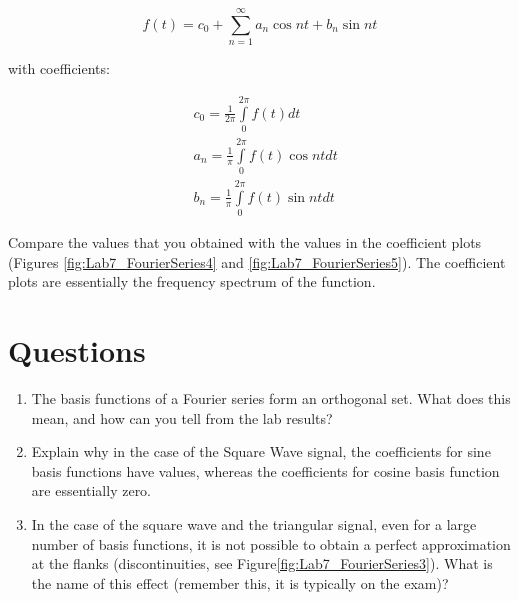 \documentclass[11pt,letterpaper]{article}
\begin{document}
\begin{enumerate}
\begin{equation}\label{Lab7_FourierSeries7}
f(t) = c_0 + \sum\limits_{n=1}^{\infty} a_n \cos nt + b_n \sin nt 
\end{equation}

with coefficients:

\begin{align}\label{Lab7_FourierSeries8}
 & c_0=\frac{1}{2\pi }\int\limits_{0}^{2\pi }{f\left( t \right)dt} \\ 
 & a_n=\frac{1}{\pi }\int\limits_{0}^{2\pi }{f\left( t \right)\cos ntdt} \\ 
 & b_n=\frac{1}{\pi }\int\limits_{0}^{2\pi }{f\left( t \right)\sin ntdt}
\end{align}

Compare the values that you obtained with the values in the coefficient plots (Figures \ref{fig:Lab7_FourierSeries4} and \ref{fig:Lab7_FourierSeries5}). The coefficient plots are essentially the frequency spectrum of the function.
\end{enumerate}

\section{Questions}

\begin{enumerate}
\item The basis functions of a Fourier series form an orthogonal set. What does this mean, and how can you tell from the lab results? 
\item Explain why in the case of the Square Wave signal, the coefficients for sine basis functions have values, whereas the coefficients for cosine basis function are essentially zero.
\item In the case of the square wave and the triangular signal, even for a large number of basis functions, it is not possible to obtain a perfect approximation at the flanks (discontinuities, see Figure\ref{fig:Lab7_FourierSeries3}). What is the name of this effect (remember this, it is typically on the exam)?
\end{enumerate}
	
\end{document}
